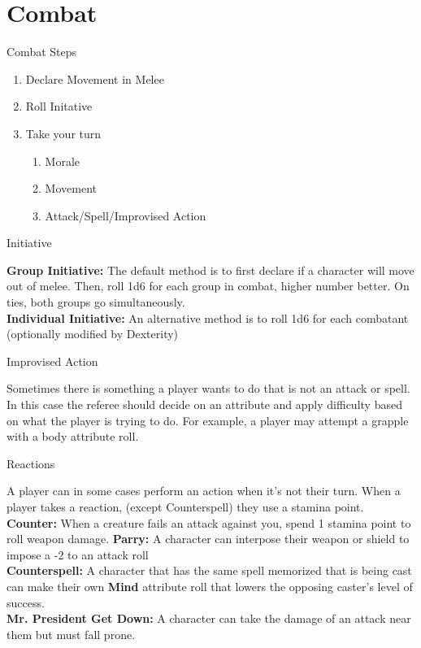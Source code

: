 \section*{Combat} %
\begin{mercHeading}
Combat Steps
\end{mercHeading}
\begin{enumerate}
\setlength\itemsep{0em}
	\item Declare Movement in Melee
	\item Roll Initative
	\item Take your turn
	\begin{enumerate}
	\item Morale
	\item Movement
	\item Attack/Spell/Improvised Action
	\end{enumerate}
\end{enumerate}
\begin{mercHeading}
Initiative 
\end{mercHeading}
\textbf{Group Initiative:} The default method is to first declare if a character will move out of melee. Then, roll 1d6 for each group in combat, higher number better. On ties, both groups go simultaneously.\\
\textbf{Individual Initiative:} An alternative method is to roll 1d6 for each combatant (optionally modified by Dexterity)

\begin{mercHeading}
Improvised Action 
\end{mercHeading}
Sometimes there is something a player wants to do that is not an attack or spell. In this case the referee should decide on an attribute and apply difficulty based on what the player is trying to do. For example, a player may attempt a grapple with a body attribute roll.

\begin{mercHeading}
Reactions
\end{mercHeading}
A player can in some cases perform an action when it's not their turn. When a player takes a reaction, (except Counterspell) they use a stamina point.\\
\textbf{Counter:} When a creature fails an attack against you, spend 1 stamina point to roll weapon damage.
\textbf{Parry:} A character can interpose their weapon or shield to impose a -2 to an attack roll\\
\textbf{Counterspell:} A character that has the same spell memorized that is being cast can make their own \textbf{Mind} attribute roll that lowers the opposing caster's level of success.\\
\textbf{Mr. President Get Down:} A character can take the damage of an attack near them but must fall prone.


